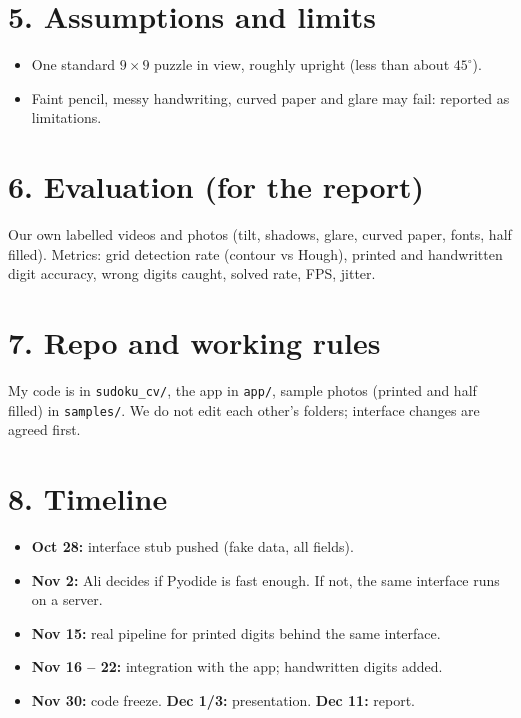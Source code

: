 \documentclass[10pt]{article}
\begin{document}
\section*{5. Assumptions and limits}

\begin{itemize}
  \item One standard $9\times9$ puzzle in view, roughly upright (less than about $45^\circ$).
  \item Faint pencil, messy handwriting, curved paper and glare may fail: reported as limitations.
\end{itemize}

\section*{6. Evaluation (for the report)}

Our own labelled videos and photos (tilt, shadows, glare, curved paper, fonts, half filled).
Metrics: grid detection rate (contour vs Hough), printed and handwritten digit accuracy, wrong
digits caught, solved rate, FPS, jitter.

\section*{7. Repo and working rules}

My code is in \texttt{sudoku\_cv/}, the app in \texttt{app/}, sample photos (printed and half
filled) in \texttt{samples/}. We do not edit each other's folders; interface changes are agreed
first.

\section*{8. Timeline}

\begin{itemize}
  \item \textbf{Oct 28:} interface stub pushed (fake data, all fields).
  \item \textbf{Nov 2:} Ali decides if Pyodide is fast enough. If not, the same interface runs on
        a server.
  \item \textbf{Nov 15:} real pipeline for printed digits behind the same interface.
  \item \textbf{Nov 16 -- 22:} integration with the app; handwritten digits added.
  \item \textbf{Nov 30:} code freeze. \textbf{Dec 1/3:} presentation. \textbf{Dec 11:} report.
\end{itemize}
\end{document}
